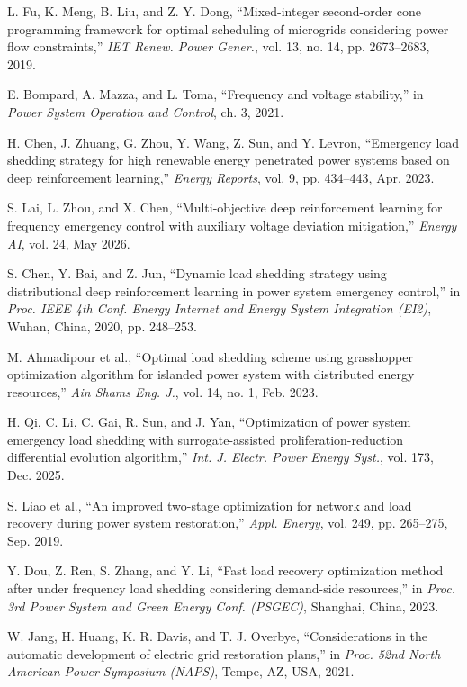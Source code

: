 L. Fu, K. Meng, B. Liu, and Z. Y. Dong, ``Mixed-integer second-order cone programming framework for optimal scheduling of microgrids considering power flow constraints,'' \emph{IET Renew. Power Gener.}, vol. 13, no. 14, pp. 2673--2683, 2019.

E. Bompard, A. Mazza, and L. Toma, ``Frequency and voltage stability,'' in \emph{Power System Operation and Control}, ch. 3, 2021.

H. Chen, J. Zhuang, G. Zhou, Y. Wang, Z. Sun, and Y. Levron, ``Emergency load shedding strategy for high renewable energy penetrated power systems based on deep reinforcement learning,'' \emph{Energy Reports}, vol. 9, pp. 434--443, Apr. 2023.

S. Lai, L. Zhou, and X. Chen, ``Multi-objective deep reinforcement learning for frequency emergency control with auxiliary voltage deviation mitigation,'' \emph{Energy AI}, vol. 24, May 2026.

S. Chen, Y. Bai, and Z. Jun, ``Dynamic load shedding strategy using distributional deep reinforcement learning in power system emergency control,'' in \emph{Proc. IEEE 4th Conf. Energy Internet and Energy System Integration (EI2)}, Wuhan, China, 2020, pp. 248--253.

M. Ahmadipour et al., ``Optimal load shedding scheme using grasshopper optimization algorithm for islanded power system with distributed energy resources,'' \emph{Ain Shams Eng. J.}, vol. 14, no. 1, Feb. 2023.

H. Qi, C. Li, C. Gai, R. Sun, and J. Yan, ``Optimization of power system emergency load shedding with surrogate-assisted proliferation-reduction differential evolution algorithm,'' \emph{Int. J. Electr. Power Energy Syst.}, vol. 173, Dec. 2025.

S. Liao et al., ``An improved two-stage optimization for network and load recovery during power system restoration,'' \emph{Appl. Energy}, vol. 249, pp. 265--275, Sep. 2019.

Y. Dou, Z. Ren, S. Zhang, and Y. Li, ``Fast load recovery optimization method after under frequency load shedding considering demand-side resources,'' in \emph{Proc. 3rd Power System and Green Energy Conf. (PSGEC)}, Shanghai, China, 2023.

W. Jang, H. Huang, K. R. Davis, and T. J. Overbye, ``Considerations in the automatic development of electric grid restoration plans,'' in \emph{Proc. 52nd North American Power Symposium (NAPS)}, Tempe, AZ, USA, 2021.

